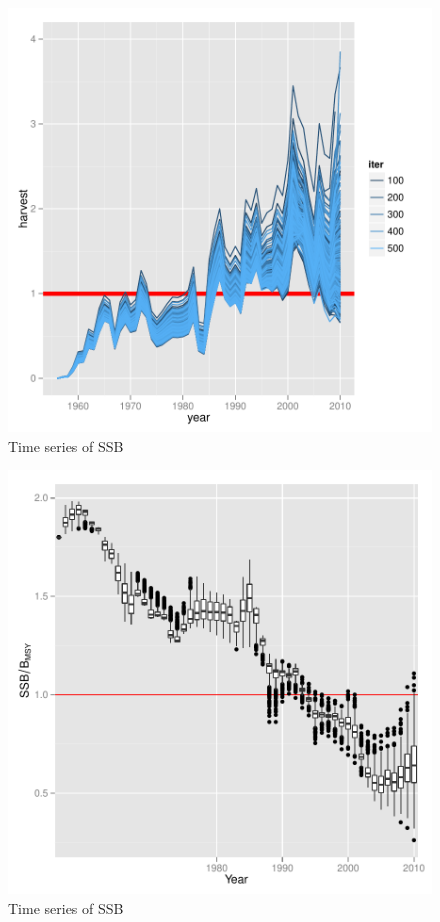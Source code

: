 \documentclass[a4paper, 11pt, oldtoc]{artikel1}
\begin{document}
\begin{figure}
\begin{center}
\includegraphics{kobe-006}
\caption{Time series of SSB}
\end{center}
\end{figure}

\begin{figure}
\begin{center}
\includegraphics{kobe-007}
\caption{Time series of SSB}
\end{center}
\end{figure}
\end{document}
